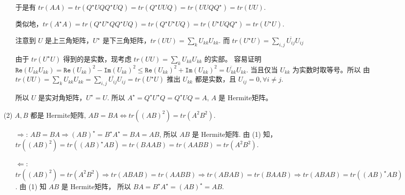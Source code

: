 \documentclass{article}
\begin{document}
\begin{spacing}{1.5}
\begin{itemize}
\begin{itemize}
\begin{itemize}
            于是有 $tr(AA) = tr(Q^\star U Q Q^\star U Q) = tr(Q^\star U U Q) = tr(UUQQ^\star) = tr(UU)$.
            
            类似地，$tr(A^\star A) = tr(Q^\star U^\star QQ^\star U Q) = tr(Q^\star U^\star U Q) = tr(U^\star U Q Q^\star) = tr(U^\star U)$. 
        
            注意到 $U$ 是上三角矩阵，$U^\star$ 是下三角矩阵，$tr(UU) = \sum_{k} U_{kk}U_{kk}$. 而 $tr(U^\star U) = \sum_{i,j}\overline{U_{ij}}U_{ij}$
            
            由于 $tr(U^\star U)$ 得到的是实数，现考虑 $tr(UU) = \sum_{k} U_{kk}U_{kk}$ 的实部。
            容易证明 $\mathtt{Re}(U_{kk}U_{kk}) = \mathtt{Re}(U_{kk})^2 - \mathtt{Im}(U_{kk})^2 \leq \mathtt{Re}(U_{kk})^2 + \mathtt{Im}(U_{kk})^2 = \overline{U_{kk}}U_{kk}$.
            当且仅当 $U_{kk}$ 为实数时取等号。所以 由 $tr(UU) = \sum_{k} U_{kk}U_{kk} = \sum_{i,j}\overline{U_{ij}}U_{ij} = tr(U^\star U)$ 推出 $U_{kk}$ 都是实数，且 $U_{ij}=0, \forall i\ne j$.

            所以 $U$ 是实对角矩阵，$U^\star = U$. 所以 $A^\star = Q^\star U^\star Q = Q^\star U Q = A$, $A$ 是 Hermite矩阵。

        \end{itemize}
        \item [(2)] $A, B$ 都是 Hermite矩阵, $AB = BA \Leftrightarrow tr((AB)^2) = tr(A^2B^2)$.
        \begin{itemize}
            \item [$\Rightarrow$:] $AB = BA \Rightarrow (AB)^\star = B^\star A^\star = BA = AB$, 所以 $AB$ 是 Hermite矩阵. 由 (1) 知，$tr((AB)^2) = tr((AB)^\star AB) = tr(BAAB) = tr(AABB) = tr(A^2B^2)$.
            \item [$\Leftarrow$:] $tr((AB)^2) = tr(A^2B^2) \Rightarrow tr(ABAB) = tr(AABB) \Rightarrow tr(ABAB) = tr(BAAB) \Rightarrow tr(ABAB) = tr((AB)^\star AB)$. 由 (1) 知 $AB$ 是 Hermite矩阵，
            所以 $BA = B^\star A^\star = (AB)^\star = AB$. 
        \end{itemize}
    \end{itemize}


\end{itemize}
\end{spacing}
\end{document}
